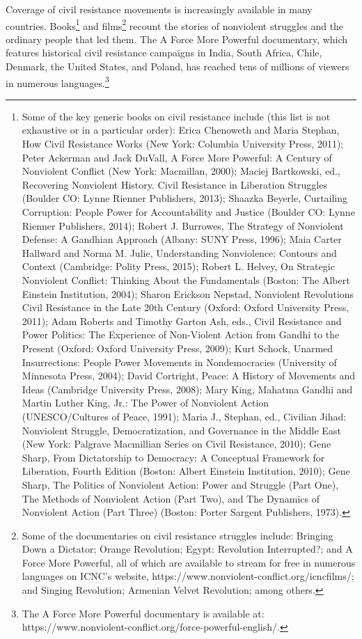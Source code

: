 \documentclass[twoside,a4paper,12pt,fleqn,openany]{extbook}
\begin{document}
Coverage of civil resistance movements is increasingly available in many countries. Books\footnote{Some of the key generic books on civil resistance include (this list is not exhaustive or in a particular order): Erica Chenoweth and Maria Stephan, How Civil Resistance Works (New York: Columbia University Press, 2011); Peter Ackerman and Jack DuVall, A Force More Powerful: A Century of Nonviolent Conflict (New York: Macmillan, 2000); Maciej Bartkowski, ed., Recovering Nonviolent History. Civil Resistance in Liberation Struggles (Boulder CO: Lynne Rienner Publishers, 2013); Shaazka Beyerle, Curtailing Corruption: People Power for Accountability and Justice (Boulder CO: Lynne Rienner Publishers, 2014); Robert J. Burrowes, The Strategy of Nonviolent Defense: A Gandhian Approach (Albany: SUNY Press, 1996); Maia Carter Hallward and Norma M. Julie, Understanding Nonviolence: Contours and Context (Cambridge: Polity Press, 2015); Robert L. Helvey, On Strategic Nonviolent Conflict: Thinking About the Fundamentals (Boston: The Albert Einstein Institution, 2004); Sharon Erickson Nepstad, Nonviolent Revolutions Civil Resistance in the Late 20th Century (Oxford: Oxford University Press, 2011); Adam Roberts and Timothy Garton Ash, eds., Civil Resistance and Power Politics: The Experience of Non-Violent Action from Gandhi to the Present (Oxford: Oxford University Press, 2009); Kurt Schock, Unarmed Insurrections: People Power Movements in Nondemocracies (University of Minnesota Press, 2004); David Cortright, Peace: A History of Movements and Ideas (Cambridge University Press, 2008); Mary King, Mahatma Gandhi and Martin Luther King, Jr.: The Power of Nonviolent Action (UNESCO/Cultures of Peace, 1991); Maria J., Stephan, ed., Civilian Jihad: Nonviolent Struggle, Democratization, and Governance in the Middle East (New York: Palgrave Macmillian Series on Civil Resistance, 2010); Gene Sharp, From Dictatorship to Democracy: A Conceptual Framework for Liberation, Fourth Edition (Boston: Albert Einstein Institution, 2010); Gene Sharp, The Politics of Nonviolent Action: Power and Struggle (Part One), The Methods of Nonviolent Action (Part Two), and The Dynamics of Nonviolent Action (Part Three) (Boston: Porter Sargent Publishers, 1973).} and films\footnote{Some of the documentaries on civil resistance struggles include: Bringing Down a Dictator; Orange Revolution; Egypt: Revolution Interrupted?; and A Force More Powerful, all of which are available to stream for free in numerous languages on ICNC’s website, https://www.nonviolent-conflict.org/icncfilms/; and Singing Revolution; Armenian Velvet Revolution; among others.} recount the stories of nonviolent struggles and the ordinary people that led them. The A Force More Powerful documentary, which features historical civil resistance campaigns in India, South Africa, Chile, Denmark, the United States, and Poland, has reached tens of millions of viewers in numerous languages.\footnote{The A Force More Powerful documentary is available at: https://www.nonviolent-conflict.org/force-powerful-english/.}
\end{document}
